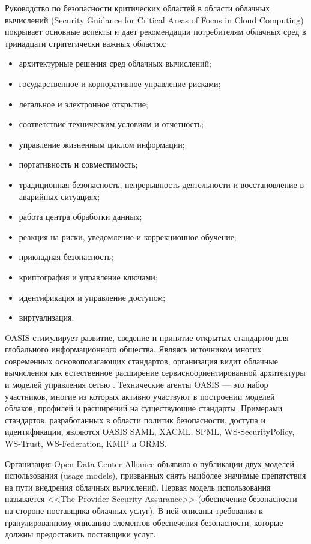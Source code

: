 Руководство по безопасности критических областей в области облачных вычислений (Security Guidance for Critical Areas of Focus in Cloud Computing) покрывает основные аспекты и дает рекомендации потребителям облачных сред в тринадцати стратегически важных областях:
\begin{itemize}
  \item архитектурные решения сред облачных вычислений;
  \item государственное и корпоративное управление рисками;
  \item легальное и электронное открытие;
  \item соответствие техническим условиям и отчетность;
  \item управление жизненным циклом информации;
  \item портативность и совместимость;
  \item традиционная безопасность, непрерывность деятельности и восстановление в аварийных ситуациях;
  \item работа центра обработки данных;
  \item реакция на риски, уведомление и коррекционное обучение;
  \item прикладная безопасность;
  \item криптография и управление ключами;
  \item идентификация и управление доступом;
  \item виртуализация.
\end{itemize}

OASIS стимулирует развитие, сведение и принятие открытых стандартов для глобального информационного общества. Являясь источником многих современных основополагающих стандартов, организация видит облачные вычисления как естественное расширение сервисноориентированной архитектуры и моделей управления сетью \cite{psta}.
Технические агенты OASIS –– это набор участников, многие из которых активно участвуют в построении моделей облаков, профилей и расширений на существующие стандарты.
Примерами стандартов, разработанных в области политик безопасности, доступа и идентификации, являются OASIS SAML, XACML, SPML, WS-SecurityPolicy, WS-Trust, WS-Federation, KMIP и ORMS.

Организация Open Data Center Alliance объявила о публикации двух моделей использования (usage models), призванных снять наиболее значимые препятствия на пути внедрения облачных вычислений.
Первая модель использования называется <<The Provider Security Assurance>> (обеспечение безопасности на стороне поставщика облачных услуг).
В ней описаны требования к гранулированному описанию элементов обеспечения безопасности, которые должны предоставить поставщики услуг.

